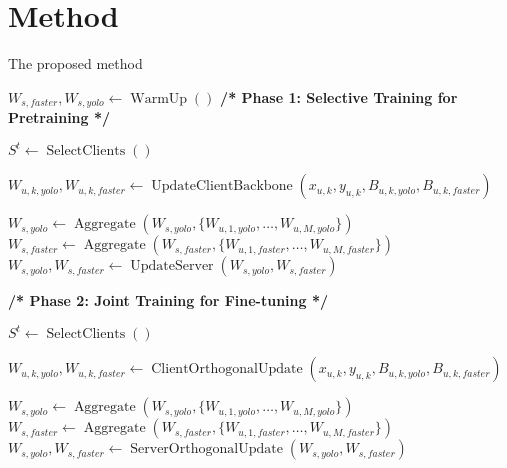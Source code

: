 \section{Method}

\begin{algorithm}
	\caption{The proposed method}
	\begin{algorithmic}[1]

		\State $W_{s,faster}, W_{s,yolo}\gets \operatorname{WarmUp}()$
		\Statex \textbf{/* Phase 1: Selective Training for Pretraining */}

		\State $S^t \gets \operatorname{SelectClients}()$

		\State $W_{u,k,yolo}, W_{u,k,faster} \gets \operatorname{UpdateClientBackbone}(x_{u,k},y_{u,k}, B_{u,k,yolo},
			B_{u,k,faster})$
		\EndFor

		\State $W_{s,yolo} \gets \operatorname{Aggregate}(W_{s,yolo}, \{W_{u,1,yolo}, \ldots, W_{u,M,yolo}\})$
		\State $W_{s,faster} \gets \operatorname{Aggregate}(W_{s,faster}, \{W_{u,1,faster}, \ldots, W_{u,M,faster}\})$
        \State $W_{s,yolo}, W_{s,faster} \gets \operatorname{UpdateServer}(W_{s,yolo}, W_{s,faster})$
		\EndFor

        \Statex \textbf{/* Phase 2: Joint Training for Fine-tuning */}

        \State $S^t \gets \operatorname{SelectClients}()$

        \State $W_{u,k,yolo}, W_{u,k,faster} \gets \operatorname{ClientOrthogonalUpdate}(x_{u,k},y_{u,k}, B_{u,k,yolo},
            B_{u,k,faster})$
        \EndFor

        \State $W_{s,yolo} \gets \operatorname{Aggregate}(W_{s,yolo}, \{W_{u,1,yolo}, \ldots, W_{u,M,yolo}\})$
        \State $W_{s,faster} \gets \operatorname{Aggregate}(W_{s,faster}, \{W_{u,1,faster}, \ldots, W_{u,M,faster}\})$
        \State $W_{s,yolo}, W_{s,faster} \gets \operatorname{ServerOrthogonalUpdate}(W_{s,yolo}, W_{s,faster})$
        \EndFor

		\EndProcedure
	\end{algorithmic}
\end{algorithm}
